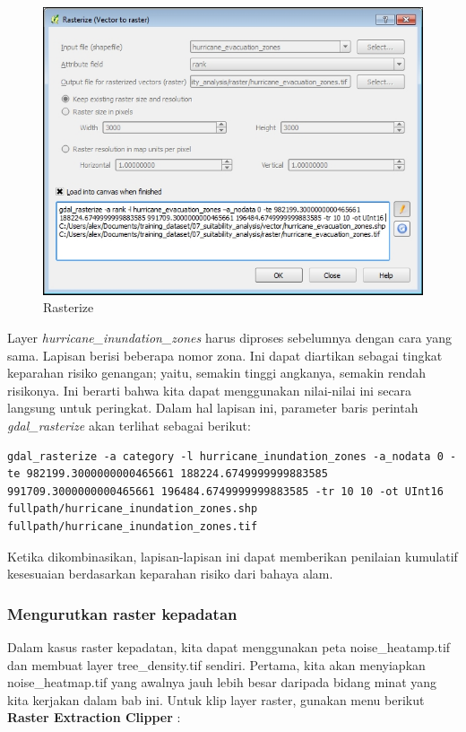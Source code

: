 \documentclass[]{book}
\begin{document}
\begin{figure}

{\centering \includegraphics[width=0.7\linewidth]{images/04/fig34} 

}

\caption{Rasterize}\label{fig:fig1434}
\end{figure}

Layer \emph{hurricane\_inundation\_zones} harus diproses sebelumnya dengan cara yang sama. Lapisan berisi beberapa nomor zona. Ini dapat diartikan sebagai tingkat keparahan risiko genangan; yaitu, semakin tinggi angkanya, semakin rendah risikonya. Ini berarti bahwa kita dapat menggunakan nilai-nilai ini secara langsung untuk peringkat. Dalam hal lapisan ini, parameter baris perintah \emph{gdal\_rasterize} akan terlihat sebagai berikut:

\begin{verbatim}
gdal_rasterize -a category -l hurricane_inundation_zones -a_nodata 0 -te 982199.3000000000465661 188224.6749999999883585 991709.3000000000465661 196484.6749999999883585 -tr 10 10 -ot UInt16 fullpath/hurricane_inundation_zones.shp fullpath/hurricane_inundation_zones.tif
\end{verbatim}

Ketika dikombinasikan, lapisan-lapisan ini dapat memberikan penilaian kumulatif kesesuaian berdasarkan keparahan risiko dari bahaya alam.

\hypertarget{mengurutkan-raster-kepadatan}{%
\subsubsection{Mengurutkan raster kepadatan}\label{mengurutkan-raster-kepadatan}}

Dalam kasus raster kepadatan, kita dapat menggunakan peta noise\_heatamp.tif dan membuat layer tree\_density.tif sendiri. Pertama, kita akan menyiapkan noise\_heatmap.tif yang awalnya jauh lebih besar daripada bidang minat yang kita kerjakan dalam bab ini. Untuk klip layer raster, gunakan menu berikut \textbf{Raster \textbar{} Extraction \textbar{} Clipper} :
\end{document}
